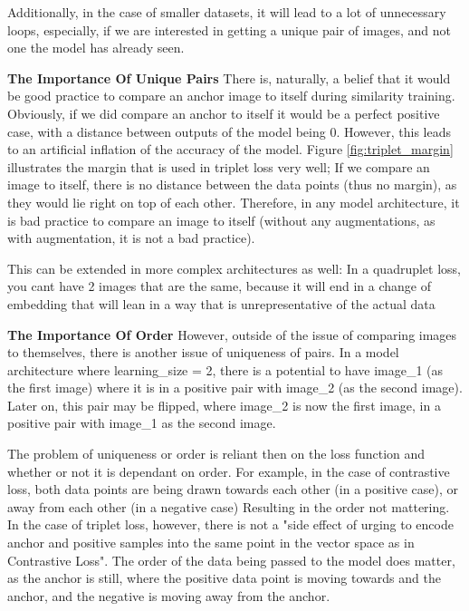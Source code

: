\documentclass[
	letterpaper, %
	10pt, %
	unnumberedsections, %
	twoside, %
]{LTJournalArticle}
\begin{document}
Additionally, in the case of smaller datasets, it will lead to a lot of unnecessary loops, especially, if we are interested in getting a unique pair of images, and not one the model has already seen.



\textbf{The Importance Of Unique Pairs}
There is, naturally, a belief that it would be good practice to compare an anchor image to itself during similarity training. Obviously, if we did compare an anchor to itself it would be a perfect positive case, with a distance between outputs of the model being 0.
However, this leads to an artificial inflation of the accuracy of the model. Figure \ref{fig:triplet_margin} illustrates the margin that is used in triplet loss very well; If we compare an image to itself, there is no distance between the data points (thus no margin), as they would lie right on top of each other.
Therefore, in any model architecture, it is bad practice to compare an image to itself (without any augmentations, as with augmentation, it is not a bad practice).

This can be extended in more complex architectures as well:
In a quadruplet loss, you cant have 2 images that are the same, because it will end in a change of embedding that will lean in a way that is unrepresentative of the actual data

\textbf{The Importance Of Order}
However, outside of the issue of comparing images to themselves, there is another issue of uniqueness of pairs.
In a model architecture where learning\_size = 2, there is a potential to have image\_1 (as the first image) where it is in a positive pair with image\_2 (as the second image). Later on, this pair may be flipped, where image\_2 is now the first image, in a positive pair with image\_1 as the second image.

The problem of uniqueness or order is reliant then on the loss function and whether or not it is dependant on order. For example, in the case of contrastive loss, both data points are being drawn towards each other (in a positive case), or away from each other (in a negative case) Resulting in the order not mattering.
In the case of triplet loss, however, there is not a "side effect of urging to encode anchor and positive samples into the same point in the vector space as in Contrastive Loss"\autocite{yusuf_sar}. The order of the data being passed to the model does matter, as the anchor is still, where the positive data point is moving towards and the anchor, and the negative is moving away from the anchor.
\end{document}
